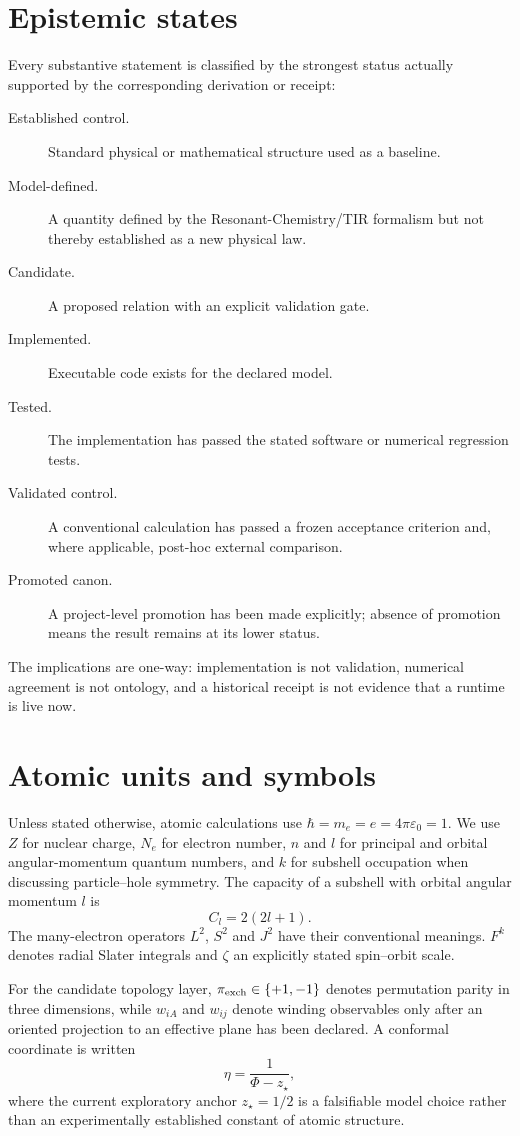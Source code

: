 \section{Epistemic states}
Every substantive statement is classified by the strongest status actually supported by the corresponding derivation or receipt:
\begin{description}
\item[Established control.] Standard physical or mathematical structure used as a baseline.
\item[Model-defined.] A quantity defined by the Resonant-Chemistry/TIR formalism but not thereby established as a new physical law.
\item[Candidate.] A proposed relation with an explicit validation gate.
\item[Implemented.] Executable code exists for the declared model.
\item[Tested.] The implementation has passed the stated software or numerical regression tests.
\item[Validated control.] A conventional calculation has passed a frozen acceptance criterion and, where applicable, post-hoc external comparison.
\item[Promoted canon.] A project-level promotion has been made explicitly; absence of promotion means the result remains at its lower status.
\end{description}
The implications are one-way: implementation is not validation, numerical agreement is not ontology, and a historical receipt is not evidence that a runtime is live now.

\section{Atomic units and symbols}
Unless stated otherwise, atomic calculations use $\hbar=m_e=e=4\pi\varepsilon_0=1$.  We use $Z$ for nuclear charge, $N_e$ for electron number, $n$ and $l$ for principal and orbital angular-momentum quantum numbers, and $k$ for subshell occupation when discussing particle--hole symmetry.  The capacity of a subshell with orbital angular momentum $l$ is
\begin{equation}
C_l=2(2l+1).
\end{equation}
The many-electron operators $L^2$, $S^2$ and $J^2$ have their conventional meanings.  $F^k$ denotes radial Slater integrals and $\zeta$ an explicitly stated spin--orbit scale.

For the candidate topology layer, $\pi_{\rm exch}\in\{+1,-1\}$ denotes permutation parity in three dimensions, while $w_{iA}$ and $w_{ij}$ denote winding observables only after an oriented projection to an effective plane has been declared.  A conformal coordinate is written
\begin{equation}
\eta=\frac{1}{\Phi-z_\star},
\end{equation}
where the current exploratory anchor $z_\star=1/2$ is a falsifiable model choice rather than an experimentally established constant of atomic structure.

